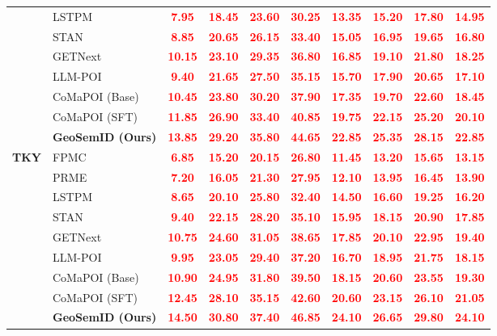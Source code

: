 \documentclass[10pt,fontset=none,twocolumn]{ctexart}
\newcommand{\mock}[1]{\textbf{\textcolor{red}{#1}}}
\begin{document}
\begin{table}[!t]
{\begin{tabular}{llcccccccc}
& LSTPM & \mock{7.95} & \mock{18.45} & \mock{23.60} & \mock{30.25} & \mock{13.35} & \mock{15.20} & \mock{17.80} & \mock{14.95} \\
& STAN & \mock{8.85} & \mock{20.65} & \mock{26.15} & \mock{33.40} & \mock{15.05} & \mock{16.95} & \mock{19.65} & \mock{16.80} \\
& GETNext & \mock{10.15} & \mock{23.10} & \mock{29.35} & \mock{36.80} & \mock{16.85} & \mock{19.10} & \mock{21.80} & \mock{18.25} \\
& LLM-POI & \mock{9.40} & \mock{21.65} & \mock{27.50} & \mock{35.15} & \mock{15.70} & \mock{17.90} & \mock{20.65} & \mock{17.10} \\
& CoMaPOI (Base) & \mock{10.45} & \mock{23.80} & \mock{30.20} & \mock{37.90} & \mock{17.35} & \mock{19.70} & \mock{22.60} & \mock{18.45} \\
& CoMaPOI (SFT) & \mock{11.85} & \mock{26.90} & \mock{33.40} & \mock{40.85} & \mock{19.75} & \mock{22.15} & \mock{25.20} & \mock{20.10} \\
& \textbf{GeoSemID (Ours)} & \mock{13.85} & \mock{29.20} & \mock{35.80} & \mock{44.65} & \mock{22.85} & \mock{25.35} & \mock{28.15} & \mock{22.85} \\ \midrule
\textbf{TKY} & FPMC & \mock{6.85} & \mock{15.20} & \mock{20.15} & \mock{26.80} & \mock{11.45} & \mock{13.20} & \mock{15.65} & \mock{13.15} \\
& PRME & \mock{7.20} & \mock{16.05} & \mock{21.30} & \mock{27.95} & \mock{12.10} & \mock{13.95} & \mock{16.45} & \mock{13.90} \\
& LSTPM & \mock{8.65} & \mock{20.10} & \mock{25.80} & \mock{32.40} & \mock{14.50} & \mock{16.60} & \mock{19.25} & \mock{16.20} \\
& STAN & \mock{9.40} & \mock{22.15} & \mock{28.20} & \mock{35.10} & \mock{15.95} & \mock{18.15} & \mock{20.90} & \mock{17.85} \\
& GETNext & \mock{10.75} & \mock{24.60} & \mock{31.05} & \mock{38.65} & \mock{17.85} & \mock{20.10} & \mock{22.95} & \mock{19.40} \\
& LLM-POI & \mock{9.95} & \mock{23.05} & \mock{29.40} & \mock{37.20} & \mock{16.70} & \mock{18.95} & \mock{21.75} & \mock{18.15} \\
& CoMaPOI (Base) & \mock{10.90} & \mock{24.95} & \mock{31.80} & \mock{39.50} & \mock{18.15} & \mock{20.60} & \mock{23.55} & \mock{19.30} \\
& CoMaPOI (SFT) & \mock{12.45} & \mock{28.10} & \mock{35.15} & \mock{42.60} & \mock{20.60} & \mock{23.15} & \mock{26.10} & \mock{21.05} \\
& \textbf{GeoSemID (Ours)} & \mock{14.50} & \mock{30.80} & \mock{37.40} & \mock{46.85} & \mock{24.10} & \mock{26.65} & \mock{29.80} & \mock{24.10} \\ \bottomrule
\end{tabular}%
}
\end{table}
\end{document}
